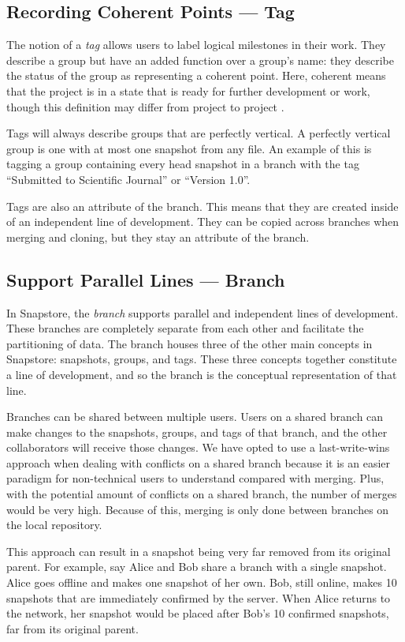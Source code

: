 \subsection{Recording Coherent Points --- Tag}

The notion of a \textit{tag} allows users to label logical milestones in their work. They describe a group but have an added function over a group's name: they describe the status of the group as representing a coherent point. Here, coherent means that the project is in a state that is ready for further development or work, though this definition may differ from project to project \cite{RossoJackson}. 

Tags will always describe groups that are perfectly vertical. A perfectly vertical group is one with at most one snapshot from any file. An example of this is tagging a group containing every head snapshot in a branch with the tag ``Submitted to Scientific Journal'' or ``Version 1.0''.

Tags are also an attribute of the branch. This means that they are created inside of an independent line of development. They can be copied across branches when merging and cloning, but they stay an attribute of the branch.

\subsection{Support Parallel Lines --- Branch}

In Snapstore, the \textit{branch} supports parallel and independent lines of development. These branches are completely separate from each other and facilitate the partitioning of data. The branch houses three of the other main concepts in Snapstore: snapshots, groups, and tags. These three concepts together constitute a line of development, and so the branch is the conceptual representation of that line.

Branches can be shared between multiple users. Users on a shared branch can make changes to the snapshots, groups, and tags of that branch, and the other collaborators will receive those changes. We have opted to use a last-write-wins approach when dealing with conflicts on a shared branch because it is an easier paradigm for non-technical users to understand compared with merging. Plus, with the potential amount of conflicts on a shared branch, the number of merges would be very high. Because of this, merging is only done between branches on the local repository.

This approach can result in a snapshot being very far removed from its original parent. For example, say Alice and Bob share a branch with a single snapshot. Alice goes offline and makes one snapshot of her own. Bob, still online, makes 10 snapshots that are immediately confirmed by the server. When Alice returns to the network, her snapshot would be placed after Bob's 10 confirmed snapshots, far from its original parent.

